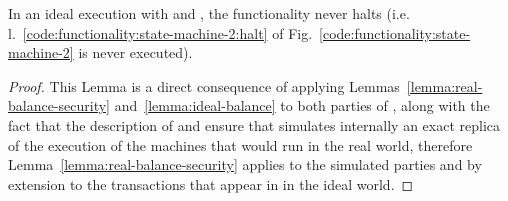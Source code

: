 \begin{lemma}[No halt]
  In an ideal execution with \fchan and \simulator, the functionality never
  halts (i.e. l.~\ref{code:functionality:state-machine-2:halt} of
  Fig.~\ref{code:functionality:state-machine-2} is never executed).
\end{lemma}

\begin{proof}
  This Lemma is a direct consequence of applying
  Lemmas~\ref{lemma:real-balance-security} and~\ref{lemma:ideal-balance} to both
  parties of \fchan, along with the fact that the description of \fchan and
  \simulator ensure that \simulator simulates internally an exact replica of the
  execution of the machines that would run in the real world, therefore
  Lemma~\ref{lemma:real-balance-security} applies to the simulated parties and
  by extension to the transactions that appear in \ledger in the ideal world.
\end{proof}

